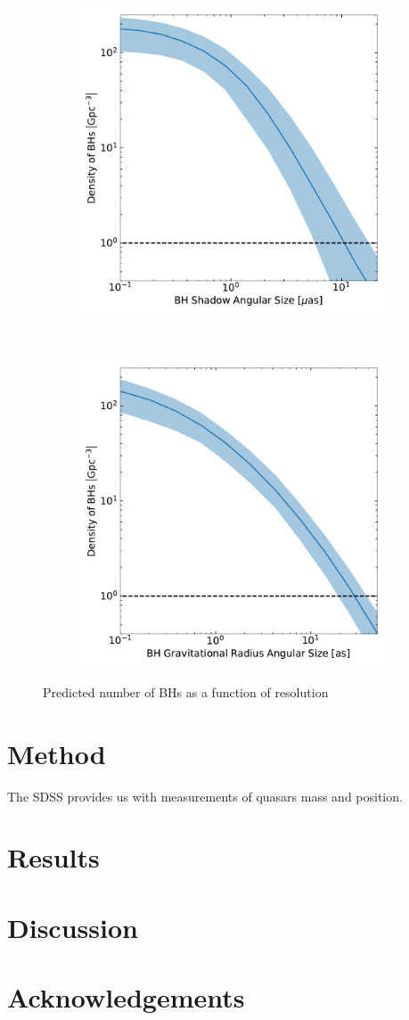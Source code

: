 \documentclass[RNAAS,twocolumn]{aastex63}
\begin{document}
\begin{figure}
    \centering
    \begin{subfigure}
        \centering
        \includegraphics[width=0.48\linewidth]{Figs/tot_shad.pdf}
    \end{subfigure}
    ~
    \begin{subfigure}
        \centering
        \includegraphics[width=0.48\linewidth]{Figs/tot_grav.pdf}
    \end{subfigure}
    \caption{Predicted number of BHs as a function of resolution \label{fig:Total_No.}}
\end{figure}


\section{Method}
The SDSS provides us with measurements of quasars mass and position.

\section{Results}




\section{Discussion}


\section*{Acknowledgements}




\end{document}
